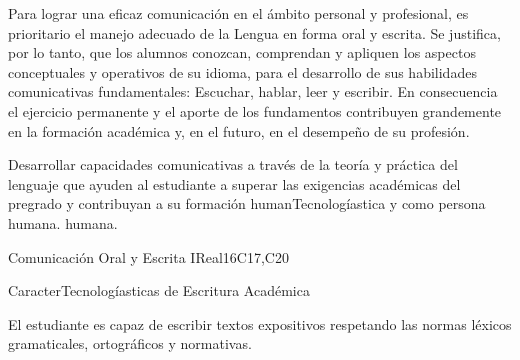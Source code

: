 \begin{syllabus}


\begin{justification}
Para lograr una eficaz comunicación en el ámbito personal y profesional, es prioritario el manejo adecuado de la Lengua en forma oral y escrita. Se justifica, por lo tanto, que los alumnos conozcan, comprendan y apliquen los aspectos conceptuales y operativos de su idioma, para el desarrollo de sus habilidades comunicativas fundamentales: Escuchar, hablar, leer y escribir.
En consecuencia el ejercicio permanente y el aporte de los fundamentos contribuyen grandemente en la formación académica y, en el futuro, en el desempeño de su profesión.
\end{justification}

\begin{goals}
\item Desarrollar capacidades comunicativas a través de la teoría y práctica del lenguaje que ayuden al estudiante a superar las exigencias académicas del pregrado y contribuyan a su formación humanTecnologíastica y como persona humana. humana.
\end{goals}

\begin{outcomes}
   \item {}
   \item {}
   \item {}
\end{outcomes}

\begin{competences}
    \item {}
    \item {}
    \item {}
\end{competences}

\begin{unit}{}{Comunicación Oral y Escrita I}{Real}{16}{C17,C20}
\begin{topics}
      \item CaracterTecnologíasticas de Escritura Académica
\end{topics}

\begin{learningoutcomes}
   \item El estudiante es capaz de escribir textos expositivos respetando las normas léxicos gramaticales, ortográficos y normativas.
\end{learningoutcomes}
\end{unit}


\begin{coursebibliography}
\end{coursebibliography}

\end{syllabus}
